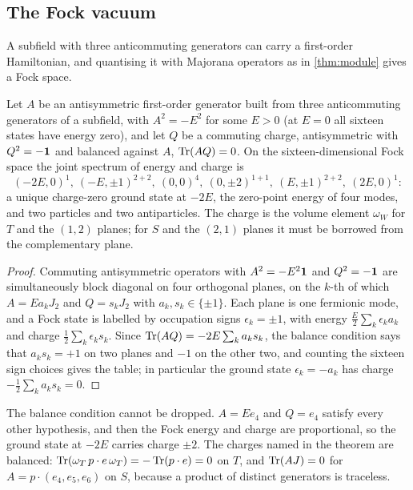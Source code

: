 \subsection{The Fock vacuum}

A subfield with three anticommuting generators can carry a first-order Hamiltonian, and quantising it with Majorana operators as in
\cref{thm:module} gives a Fock space.

\begin{theorem}
\label{thm:subfock}
Let $A$ be an antisymmetric first-order generator built from three anticommuting generators of a subfield, with $A^2=-E^2$ for some $E>0$
(at $E=0$ all sixteen states have energy zero), and let $Q$ be a
commuting charge, antisymmetric with $Q^2=-\mathbf 1$ and balanced against $A$, $\operatorname{Tr}(AQ)=0$. On the sixteen-dimensional Fock space the joint spectrum of
energy and charge is
\[
(-2E,0)^{1},\ (-E,\pm1)^{2+2},\ (0,0)^4,\ (0,\pm2)^{1+1},\ (E,\pm1)^{2+2},\ (2E,0)^1 :
\]
a unique charge-zero ground state at $-2E$, the zero-point energy of four modes, and two particles and two antiparticles. The charge is the
volume element $\omega_W$ for $T$ and the $(1,2)$ planes; for $S$ and the $(2,1)$ planes it must be borrowed from the complementary plane.
\end{theorem}

\begin{proof}
Commuting antisymmetric operators with $A^2=-E^2\mathbf 1$ and $Q^2=-\mathbf 1$ are simultaneously block diagonal on four orthogonal planes, on the $k$-th of which
$A=Ea_kJ_2$ and $Q=s_kJ_2$ with $a_k,s_k\in\{\pm1\}$. Each plane is one fermionic mode, and a Fock state is labelled by occupation signs $\epsilon_k=\pm1$, with energy
$\tfrac E2\sum_k\epsilon_ka_k$ and charge $\tfrac12\sum_k\epsilon_ks_k$. Since $\operatorname{Tr}(AQ)=-2E\sum_ka_ks_k$, the balance condition says that $a_ks_k=+1$ on two planes and
$-1$ on the other two, and counting the sixteen sign choices gives the table; in particular the ground state $\epsilon_k=-a_k$ has charge
$-\tfrac12\sum_ka_ks_k=0$.
\end{proof}

The balance condition cannot be dropped. $A=Ee_4$ and $Q=e_4$ satisfy every other hypothesis, and then the Fock energy and charge are proportional, so the
ground state at $-2E$ carries charge $\pm2$. The charges named in the theorem are balanced: $\operatorname{Tr}(\omega_T\,p\cdot e\,\omega_T)=-\operatorname{Tr}(p\cdot e)=0$ on $T$, and
$\operatorname{Tr}(AJ)=0$ for $A=p\cdot(e_4,e_5,e_6)$ on $S$, because a product of distinct generators is traceless.

